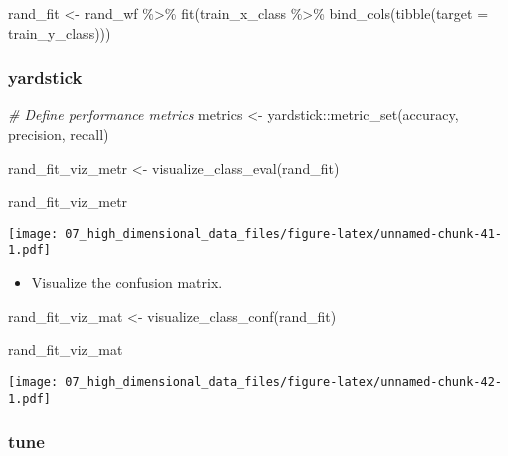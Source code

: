 \documentclass[
]{book}
\newenvironment{Shaded}{\begin{snugshade}}{\end{snugshade}}
\newcommand{\AttributeTok}[1]{\textcolor[rgb]{0.77,0.63,0.00}{#1}}
\newcommand{\CommentTok}[1]{\textcolor[rgb]{0.56,0.35,0.01}{\textit{#1}}}
\newcommand{\FunctionTok}[1]{\textcolor[rgb]{0.00,0.00,0.00}{#1}}
\newcommand{\NormalTok}[1]{#1}
\newcommand{\OtherTok}[1]{\textcolor[rgb]{0.56,0.35,0.01}{#1}}
\newcommand{\SpecialCharTok}[1]{\textcolor[rgb]{0.00,0.00,0.00}{#1}}
\providecommand{\tightlist}{%
  \setlength{\itemsep}{0pt}\setlength{\parskip}{0pt}}
\begin{document}
\begin{Shaded}
\begin{Highlighting}[]
\NormalTok{rand\_fit }\OtherTok{\textless{}{-}}\NormalTok{ rand\_wf }\SpecialCharTok{\%\textgreater{}\%} \FunctionTok{fit}\NormalTok{(train\_x\_class }\SpecialCharTok{\%\textgreater{}\%} \FunctionTok{bind\_cols}\NormalTok{(}\FunctionTok{tibble}\NormalTok{(}\AttributeTok{target =}\NormalTok{ train\_y\_class)))}
\end{Highlighting}
\end{Shaded}

\hypertarget{yardstick-2}{%
\subsubsection{yardstick}\label{yardstick-2}}

\begin{Shaded}
\begin{Highlighting}[]
\CommentTok{\# Define performance metrics }
\NormalTok{metrics }\OtherTok{\textless{}{-}}\NormalTok{ yardstick}\SpecialCharTok{::}\FunctionTok{metric\_set}\NormalTok{(accuracy, precision, recall)}

\NormalTok{rand\_fit\_viz\_metr }\OtherTok{\textless{}{-}} \FunctionTok{visualize\_class\_eval}\NormalTok{(rand\_fit)}

\NormalTok{rand\_fit\_viz\_metr}
\end{Highlighting}
\end{Shaded}

\texttt{[image: 07\_high\_dimensional\_data\_files/figure-latex/unnamed-chunk-41-1.pdf]}

\begin{itemize}
\tightlist
\item
  Visualize the confusion matrix.
\end{itemize}

\begin{Shaded}
\begin{Highlighting}[]
\NormalTok{rand\_fit\_viz\_mat }\OtherTok{\textless{}{-}} \FunctionTok{visualize\_class\_conf}\NormalTok{(rand\_fit)}

\NormalTok{rand\_fit\_viz\_mat}
\end{Highlighting}
\end{Shaded}

\texttt{[image: 07\_high\_dimensional\_data\_files/figure-latex/unnamed-chunk-42-1.pdf]}

\hypertarget{tune-2}{%
\subsubsection{tune}\label{tune-2}}
\end{document}
